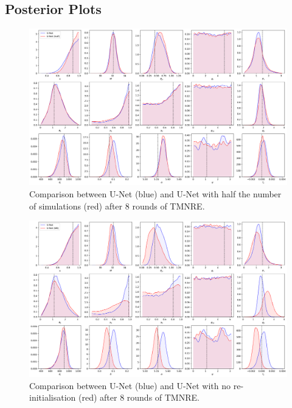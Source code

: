 \onecolumn

\appendix
\begin{appendices}

\section{Posterior Plots}
\label{sec:apx:posterior_plots}

\begin{figure}[htb]
  \centering
  \includegraphics[width=0.85\linewidth]{media/images/Posteriors_UNet_original_half_round_8.png}
  \caption{Comparison between U-Net (blue) and U-Net with half the number of simulations (red) after 8 rounds of TMNRE.}
  \label{fig:posterior_unet_half}
\end{figure}

\begin{figure}[htb]
  \centering
  \includegraphics[width=0.85\linewidth]{media/images/Posteriors_UNet_NoReinit_round_8.png}
  \caption{Comparison between U-Net (blue) and U-Net with no re-initialisation (red) after 8 rounds of TMNRE.}
  \label{fig:posterior_unet_noreinit}
\end{figure}


\end{appendices}

